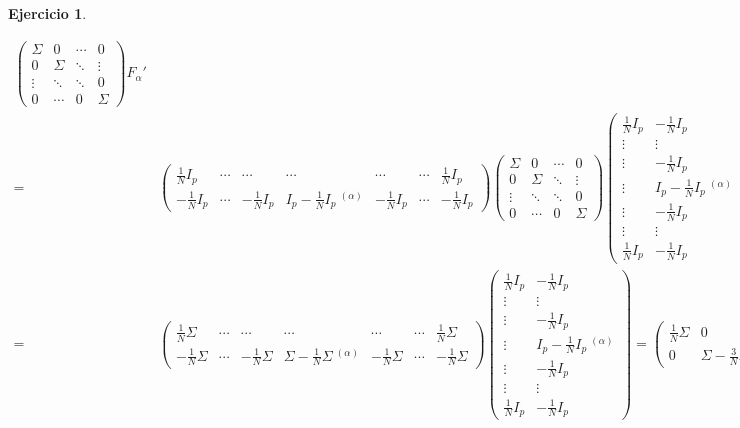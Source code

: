 \documentclass[12pt,spanish]{article}
\theoremstyle{definition}
\newtheorem{exercise}{Ejercicio}
\begin{document}
\begin{exercise}
\begin{enumerate}[$a)$]
\begin{align*}
\begin{pmatrix}
        \Sigma & 0 & \cdots & 0 \\
        0 & \Sigma & \ddots & \vdots \\
        \vdots & \ddots & \ddots & 0\\
        0 & \cdots & 0 & \Sigma
      \end{pmatrix}F_\alpha' \\
      =&\begin{pmatrix}
        \frac{1}{N}I_p & \cdots & \cdots & \cdots & \cdots & \cdots & \frac{1}{N}I_p \\
        -\frac{1}{N}I_p & \cdots & -\frac{1}{N}I_p & I_p-\frac{1}{N}I_p~^{(\alpha)} & -\frac{1}{N}I_p & \cdots & -\frac{1}{N}I_p
      \end{pmatrix}
    \begin{pmatrix}
        \Sigma & 0 & \cdots & 0 \\
        0 & \Sigma & \ddots & \vdots \\
        \vdots & \ddots & \ddots & 0\\
        0 & \cdots & 0 & \Sigma
      \end{pmatrix}\begin{pmatrix}
        \frac{1}{N}I_p & -\frac{1}{N}I_p \\ \vdots & \vdots \\ \vdots & -\frac{1}{N}I_p \\ \vdots & I_p-\frac{1}{N}I_p~^{(\alpha)} \\ \vdots & -\frac{1}{N}I_p \\ \vdots & \vdots \\ \frac{1}{N}I_p & -\frac{1}{N}I_p 
      \end{pmatrix}\\
      =&\begin{pmatrix}
        \frac{1}{N}\Sigma & \cdots & \cdots & \cdots & \cdots & \cdots & \frac{1}{N}\Sigma \\
        -\frac{1}{N}\Sigma & \cdots & -\frac{1}{N}\Sigma & \Sigma-\frac{1}{N}\Sigma~^{(\alpha)} & -\frac{1}{N}\Sigma & \cdots & -\frac{1}{N}\Sigma
      \end{pmatrix}\begin{pmatrix}
        \frac{1}{N}I_p & -\frac{1}{N}I_p \\ \vdots & \vdots \\ \vdots & -\frac{1}{N}I_p \\ \vdots & I_p-\frac{1}{N}I_p~^{(\alpha)} \\ \vdots & -\frac{1}{N}I_p \\ \vdots & \vdots \\ \frac{1}{N}I_p & -\frac{1}{N}I_p 
      \end{pmatrix}=
      \begin{pmatrix} \frac{1}{N}\Sigma & 0 \\ 0 & \Sigma - \frac{3}{N}\Sigma \end{pmatrix}
    \end{align*}


\end{enumerate}
\end{exercise}
\end{document}
